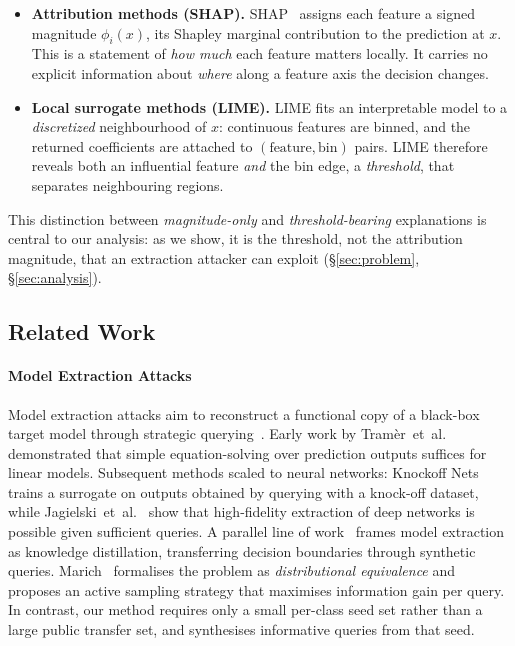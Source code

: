 \documentclass[sigconf,anonymous,review]{acmart}
\begin{document}
\begin{itemize}
  \item \textbf{Attribution methods (SHAP).} SHAP~\cite{lundberg2017shap} assigns
  each feature a signed magnitude $\phi_i(x)$, its Shapley marginal contribution
  to the prediction at $x$. This is a statement of \emph{how much} each feature matters locally. It carries no explicit information about \emph{where} along a
  feature axis the decision changes.
  \item \textbf{Local surrogate methods (LIME).} LIME fits an interpretable model
  to a \emph{discretized} neighbourhood of $x$: continuous features are binned, and
  the returned coefficients are attached to $(\text{feature}, \text{bin})$ pairs.
  LIME therefore reveals both an influential feature \emph{and} the bin edge, a \emph{threshold}, that separates neighbouring regions.
\end{itemize}

This distinction between \emph{magnitude-only} and \emph{threshold-bearing}
explanations is central to our analysis: as we show, it is the threshold, not the
attribution magnitude, that an extraction attacker can exploit
(\S\ref{sec:problem}, \S\ref{sec:analysis}).

\subsection{Related Work}
\label{subsec:related}

\paragraph{Model Extraction Attacks}
Model extraction attacks aim to reconstruct a functional copy of a black-box target model through strategic querying~\cite{tramer2016stealing}.
Early work by Tram\`er~et~al.~\cite{tramer2016stealing} demonstrated that
simple equation-solving over prediction outputs suffices for linear models.
Subsequent methods scaled to neural networks: Knockoff Nets~\cite{orekondy2019knockoff}
trains a surrogate on outputs obtained by querying with a knock-off dataset,
while Jagielski~et~al.~\cite{jagielski2020high} show that high-fidelity extraction
of deep networks is possible given sufficient queries.
A parallel line of work~\cite{papernot2017practical,correia2018copycat} frames
model extraction as knowledge distillation, transferring decision boundaries
through synthetic queries.
Marich~\cite{karmakar2023marich} formalises the problem as \emph{distributional equivalence}
and proposes an active sampling strategy that maximises information gain per query.
In contrast, our method requires only a small per-class seed set rather than a large
public transfer set, and synthesises informative queries from that seed.
\end{document}

